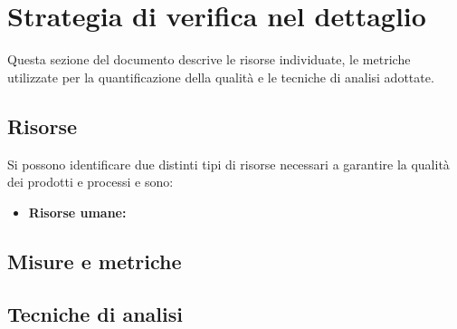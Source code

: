 \section{Strategia di verifica nel dettaglio}
  Questa sezione del documento descrive le risorse individuate, le metriche utilizzate per la quantificazione della qualità e le tecniche di analisi adottate.
  \subsection{Risorse}
  Si possono identificare due distinti tipi di risorse necessari a garantire la qualità dei prodotti e processi e sono:
  \begin{itemize}
    \item \textbf{Risorse umane:}
  \end{itemize}
  \subsection{Misure e metriche}

  \subsection{Tecniche di analisi}
